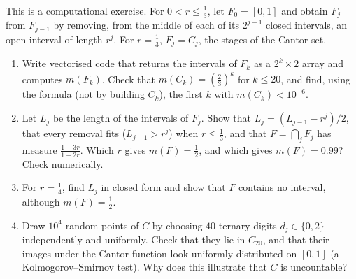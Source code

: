 \begin{exercise}\label{ex:mf-cantor-sets}
\medium This is a computational exercise. For $0<r\le\frac13$, let $F_0=[0,1]$ and obtain
$F_j$ from $F_{j-1}$ by removing, from the middle of each of its $2^{j-1}$ closed intervals,
an open interval of length $r^j$. For $r=\frac13$, $F_j=C_j$, the stages of the Cantor set.
\begin{enumerate}[label=(\alph*)]
  \item Write vectorised code that returns the intervals of $F_k$ as a $2^k\times2$ array and
    computes $m(F_k)$. Check that $m(C_k)=(\frac23)^k$ for $k\le20$, and find, using the formula
    (not by building $C_k$), the first $k$ with $m(C_k)<10^{-6}$.
  \item Let $L_j$ be the length of the intervals of $F_j$. Show that $L_j=(L_{j-1}-r^j)/2$, that
    every removal fits ($L_{j-1}>r^j$) when $r\le\frac13$, and that $F=\bigcap_jF_j$ has
    measure $\frac{1-3r}{1-2r}$. Which $r$ gives $m(F)=\frac12$, and which gives $m(F)=0.99$?
    Check numerically.
  \item For $r=\frac14$, find $L_j$ in closed form and show that $F$ contains no interval,
    although $m(F)=\frac12$.
  \item Draw $10^4$ random points of $C$ by choosing $40$ ternary digits $d_j\in\{0,2\}$
    independently and uniformly. Check that they lie in $C_{20}$, and that their images under the
    Cantor function look uniformly distributed on $[0,1]$ (a Kolmogorov--Smirnov test). Why does
    this illustrate that $C$ is uncountable?
\end{enumerate}
\end{exercise}

